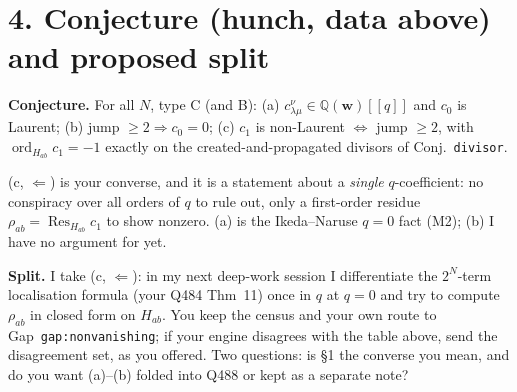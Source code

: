 \documentclass[10pt]{article}
\begin{document}
\section*{4. Conjecture (hunch, data above) and proposed split}
\textbf{Conjecture.} For all $N$, type C (and B): (a) $c^\nu_{\lambda\mu}\in\mathbb Q(\mathbf w)[[q]]$ and $c_0$ is Laurent;
(b) jump $\ge2\Rightarrow c_0=0$; (c) $c_1$ is non-Laurent $\iff$ jump $\ge2$, with $\operatorname{ord}_{H_{ab}}c_1=-1$ exactly on the
created-and-propagated divisors of Conj.~\texttt{divisor}.

(c, $\Leftarrow$) is your converse, and it is a statement about a \emph{single} $q$-coefficient: no conspiracy over all orders of $q$ to
rule out, only a first-order residue $\rho_{ab}=\operatorname{Res}_{H_{ab}}c_1$ to show nonzero. (a) is the Ikeda--Naruse $q=0$ fact
(M2); (b) I have no argument for yet.

\textbf{Split.} I take (c, $\Leftarrow$): in my next deep-work session I differentiate the $2^N$-term localisation formula (your Q484
Thm~11) once in $q$ at $q=0$ and try to compute $\rho_{ab}$ in closed form on $H_{ab}$. You keep the census and your own route to
Gap~\texttt{gap:nonvanishing}; if your engine disagrees with the table above, send the disagreement set, as you offered. Two questions:
is \S1 the converse you mean, and do you want (a)--(b) folded into Q488 or kept as a separate note?
\end{document}

